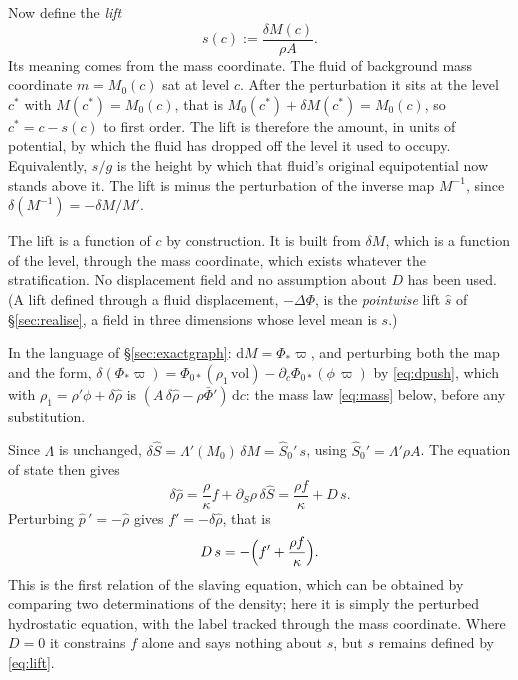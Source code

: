 \documentclass[11pt]{article}
\theoremstyle{definition}
\theoremstyle{remark}
\newcommand{\dc}{\,\mathrm{d}c}
\newcommand{\vol}{\mathrm{vol}}
\begin{document}
Now define the \emph{lift}
\begin{equation}
  s(c) := \frac{\delta M(c)}{\rho A} .
  \label{eq:lift}
\end{equation}
Its meaning comes from the mass coordinate. The fluid of background
mass coordinate $m = M_0(c)$ sat at level $c$. After the perturbation
it sits at the level $c^*$ with $M(c^*) = M_0(c)$, that is
$M_0(c^*) + \delta M(c^*) = M_0(c)$, so $c^* = c - s(c)$ to first order.
The lift is therefore the amount, in units of potential, by which the
fluid has dropped off the level it used to occupy. Equivalently, $s/g$
is the height by which that fluid's original equipotential now stands
above it. The lift is minus the perturbation of the inverse map
$M^{-1}$, since $\delta(M^{-1}) = -\delta M/M'$.

The lift is a function of $c$ by construction. It is built from
$\delta M$, which is a function of the level, through the mass
coordinate, which exists whatever the stratification. No displacement
field and no assumption about $D$ has been used. (A lift defined
through a fluid displacement, $-\Delta\Phi$, is the \emph{pointwise}
lift $\hat s$ of \S\ref{sec:realise}, a field in three dimensions whose
level mean is $s$.)

In the language of \S\ref{sec:exactgraph}: $\mathrm dM = \Phi_*\varpi$,
and perturbing both the map and the form, $\delta(\Phi_*\varpi) =
\Phi_{0*}(\rho_1\,\vol) - \partial_c\Phi_{0*}(\phi\,\varpi)$ by
\eqref{eq:dpush}, which with $\rho_1 = \rho'\phi + \delta\hat\rho$ is
$(A\,\delta\hat\rho - \rho\bar\Phi')\dc$: the mass law \eqref{eq:mass}
below, before any substitution.

Since $\Lambda$ is unchanged, $\delta\hat S = \Lambda'(M_0)\,\delta M =
\hat S_0'\,s$, using $\hat S_0' = \Lambda'\rho A$. The equation of state
then gives
\begin{equation}
  \delta\hat\rho = \frac{\rho}{\kappa}f + \partial_S\rho\,\delta\hat S
  = \frac{\rho f}{\kappa} + D\,s .
  \label{eq:drho}
\end{equation}
Perturbing $\hat p\,' = -\hat\rho$ gives $f' = -\delta\hat\rho$, that is
\begin{equation}
  D\,s = -\Bigl(f' + \frac{\rho f}{\kappa}\Bigr) .
  \label{eq:Ds}
\end{equation}
This is the first relation of the slaving equation, which can be
obtained by comparing two determinations of the density; here it is
simply the perturbed hydrostatic equation, with the label
tracked through the mass coordinate. Where $D = 0$ it constrains $f$
alone and says nothing about $s$, but $s$ remains defined by
\eqref{eq:lift}.
\end{document}
